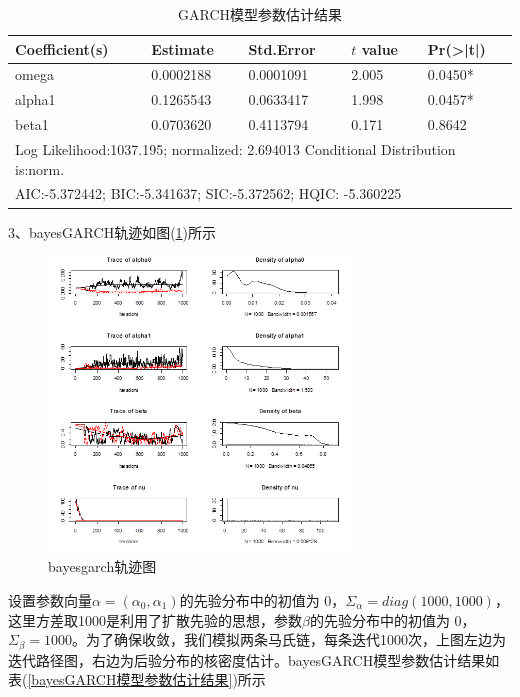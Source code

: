         \begin{table}[H]
        \centering
        \caption{GARCH模型参数估计结果}
        \label{GARCH模型参数估计结果}
        \begin{tabular}{lllll}
            \toprule
            Coefficient(s)&  Estimate  &  Std.Error & $t$ value & Pr(>|t|)\\
        \midrule
        omega  & 0.0002188  & 0.0001091 &  2.005 &  0.0450*\\
        alpha1 & 0.1265543  & 0.0633417 &  1.998 &  0.0457*\\
        beta1  & 0.0703620  & 0.4113794 &  0.171 &  0.8642 \\
        \bottomrule
        \multicolumn{5}{l}{\footnotesize Log Likelihood:1037.195; normalized: 2.694013 Conditional Distribution is:norm.}\\
        \multicolumn{5}{l}{\footnotesize AIC:-5.372442; BIC:-5.341637; SIC:-5.372562; HQIC: -5.360225}\\
        \end{tabular}
        \end{table}
    \par
     3、bayesGARCH轨迹如图(\ref{bayesgarch轨迹图})所示
     \begin{figure}[H]
     \centering
     \includegraphics[width  = 8cm]{images/bayes-GARCH.png}
     \caption{bayesgarch轨迹图}
     \label{bayesgarch轨迹图}
     \end{figure}
    \par
    设置参数向量$\alpha=(\alpha_0,\alpha_1 )$的先验分布中的初值为 0，$\Sigma_\alpha=diag(1000,1000)$，这里方差取1000是利用了扩散先验的思想，参数$\beta$的先验分布中的初值为 0，$\Sigma_\beta=1000$。为了确保收敛，我们模拟两条马氏链，每条迭代1000次，上图左边为迭代路径图，右边为后验分布的核密度估计。bayesGARCH模型参数估计结果如表(\ref{bayesGARCH模型参数估计结果})所示
